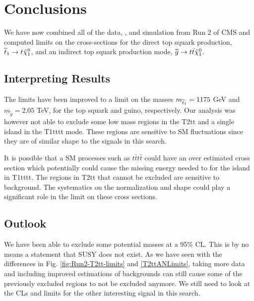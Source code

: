 \chapter{Conclusions}
\label{ch:Conclusions}

We have now combined all of the data, \datalumi{}, and simulation from Run 2 of CMS and computed limits on the cross-sections for the direct top squark production, $\widetilde{t}_1\rightarrow t\tilde{\chi}^{0}_{1}$, and an indirect top squark production mode, $\widetilde{g}\rightarrow t \bar{t}\tilde{\chi}^{0}_{1}$. 

\section{Interpreting Results}
\label{sec:Interp}

The limits have been improved to a limit on the masses $m_{\widetilde{t}_1}=1175$ GeV and $m_{\widetilde{g}}=2.05$ TeV, for the top squark and guino, respectively. Our analysis was however not able to exclude some low mass regions in the T2tt and a single island in the T1tttt mode. These regions are sensitive to SM fluctuations since they are of similar shape to the signals in this search. 

It is possible that a SM processes such as $t\bar{t}t\bar{t}$ could have an over estimated cross section which potentially could cause the missing energy needed to for the island in T1tttt. The regions in T2tt that cannot be excluded are sensitive to \Znunu{} background. The \Znunu{} systematics on the normalization and shape could play a significant role in the limit on these cross sections. 

\section{Outlook}
\label{sec:outlook}

We have been able to exclude some potential masses at a 95\% CL. This is by no means a statement that SUSY does not exist. As we have seen with the differences in Fig. \ref{fig:Run2-T2tt-limits} and \ref{T2ttANLimits}, taking more data and including improved estimations of backgrounds can still cause some of the previously excluded regions to not be excluded anymore. We still need to look at the CLs and limits for the other interesting signal in this search. 